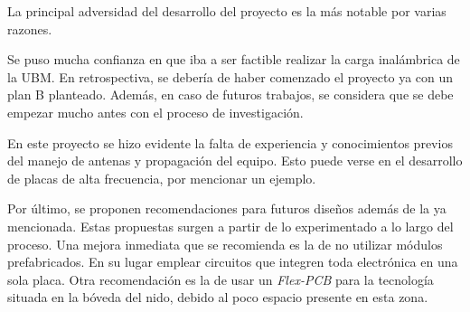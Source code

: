 La principal adversidad del desarrollo del proyecto es la más notable por varias razones.

Se puso mucha confianza en que iba a ser factible realizar la carga inalámbrica de la UBM. En retrospectiva, se debería de haber comenzado el proyecto ya con un plan B planteado. Además, en caso de futuros trabajos, se considera que se debe empezar mucho antes con el proceso de investigación. 

En este proyecto se hizo evidente la falta de experiencia y conocimientos previos del manejo de antenas y propagación del equipo. Esto puede verse en el desarrollo de placas de alta frecuencia, por mencionar un ejemplo.

Por último, se proponen recomendaciones para futuros diseños además de la ya mencionada. Estas propuestas surgen a partir de lo experimentado a lo largo del proceso. Una mejora inmediata que se recomienda es la de no utilizar módulos prefabricados. En su lugar emplear circuitos que integren toda electrónica en una sola placa. Otra recomendación es la de usar un \textit{Flex-PCB} para la tecnología situada en la bóveda del nido, debido al poco espacio presente en esta zona.
